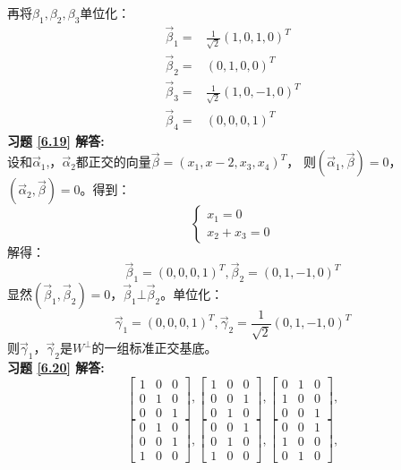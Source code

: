 \documentclass[a4paper]{book}
\begin{document}
再将$\beta_1,\beta_2,\beta_3$单位化：
\begin{align*}
\vec{\beta}_1=&\frac{1}{\sqrt{2}}(1,0,1,0)^T\\
\vec{\beta}_2=&(0,1,0,0)^T\\
\vec{\beta}_3=&\frac{1}{\sqrt{2}}(1,0,-1,0)^T\\
\vec{\beta}_4=&(0,0,0,1)^T
\end{align*}
\textbf{习题 \ref{6.19} 解答:}\\
设和$\vec{\alpha}_1$,，$\vec{\alpha}_2$都正交的向量$\vec{\beta}=(x_1,x-2,x_3,x_4)^T$，
则$(\vec{\alpha}_1,\vec{\beta})=0$，$(\vec{\alpha}_2,\vec{\beta})=0$。得到：
\begin{equation*}
  \begin{cases}
  x_1=0\\
  x_2+x_3=0
  \end{cases}
\end{equation*}
解得：
\begin{equation*}
\vec{\beta}_1=(0,0,0,1)^T,\vec{\beta}_2=(0,1,-1,0)^T
\end{equation*}
显然$(\vec{\beta}_1,\vec{\beta}_2)=0$，$\vec{\beta}_1\bot\vec{\beta}_2$。单位化：
\begin{equation*}
\vec{\gamma}_1=(0,0,0,1)^T,\vec{\gamma}_2=\frac{1}{\sqrt{2}}(0,1,-1,0)^T
\end{equation*}
则$\vec{\gamma}_1$，$\vec{\gamma}_2$是$W^{\bot}$的一组标准正交基底。\\
\textbf{习题 \ref{6.20} 解答:}\\
\begin{equation*}
 \begin{bmatrix}1&0&0\\0&1&0\\0&0&1\end{bmatrix},
 \begin{bmatrix}1&0&0\\0&0&1\\0&1&0\end{bmatrix},
 \begin{bmatrix}0&1&0\\1&0&0\\0&0&1\end{bmatrix},
\end{equation*}
\begin{equation*}
 \begin{bmatrix}0&1&0\\0&0&1\\1&0&0\end{bmatrix},
 \begin{bmatrix}0&0&1\\0&1&0\\1&0&0\end{bmatrix},
 \begin{bmatrix}0&0&1\\1&0&0\\0&1&0\end{bmatrix},
\end{equation*}
\end{document}
